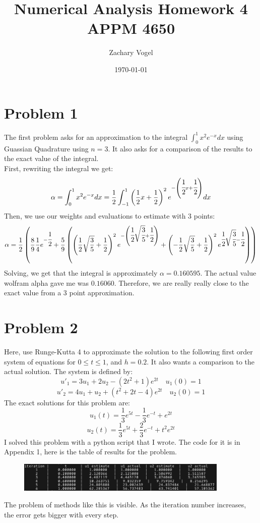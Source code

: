 \documentclass{article}
\author{Zachary Vogel}
\title{Numerical Analysis Homework 4\\ APPM 4650}
\date{\today}
\begin{document}
 



\maketitle


\section*{Problem 1}
The first problem asks for an approximation to the integral $\int_0^1x^2e^{-x}dx$ using Guassian Quadrature using $n=3$. It also asks for a comparison of the results to the exact value of the integral.\\
First, rewriting the integral we get:
\[\alpha=\int_0^1x^2e^{-x}dx=\frac{1}{2}\int_{-1}^1\left (\frac{1}{2}x+\frac{1}{2}\right )^2e^{-\left (\cfrac{1}{2}x+\cfrac{1}{2}\right )}dx\]
Then, we use our weights and evaluations to estimate with 3 points:
\[\alpha=\frac{1}{2}\left (\frac{8}{9}\frac{1}{4}e^{-\cfrac{1}{2}}+\frac{5}{9}\left (\left (\frac{1}{2}\sqrt{\frac{3}{5}}+\frac{1}{2}\right )^2e^{-\left(\cfrac{1}{2}\sqrt{\cfrac{3}{5}}+\cfrac{1}{2}\right)}+\left (-\frac{1}{2}\sqrt{\frac{3}{5}}+\frac{1}{2}\right )^2e^{\cfrac{1}{2}\sqrt{\cfrac{3}{5}}-\cfrac{1}{2}}\right )\right )\]
Solving, we get that the integral is approximately $\alpha=0.160595$. The actual value wolfram alpha gave me was $0.16060$. Therefore, we are really really close to the exact value from a 3 point approximation.

\section*{Problem 2}
Here, use Runge-Kutta 4 to approximate the solution to the following first order system of equations for $0\leq t\leq 1$, and $h=0.2$. It also wants a comparison to the actual solution. The system is defined by:
\[u'_1=3u_1+2u_2-(2t^2+1)e^{2t}\quad u_1(0)=1\]
\[u'_2=4u_1+u_2+(t^2+2t-4)e^{2t}\quad u_2(0)=1\]
The exact solutions for this problem are:
\[u_1(t)=\frac{1}{3}e^{5t}-\frac{1}{3}e^{-t}+e^{2t}\]
\[u_2(t)=\frac{1}{3}e^{5t}+\frac{2}{3}e^{-t}+t^2e^{2t}\]
I solved this problem with a python script that I wrote. The code for it is in Appendix 1, here is the table of results for the problem.
\begin{figure}[h!]
    \centering
    \includegraphics[width=0.9\textwidth]{Prob2.png}
\end{figure}
The problem of methods like this is visible. As the iteration number increases, the error gets bigger with every step.
\end{document}
